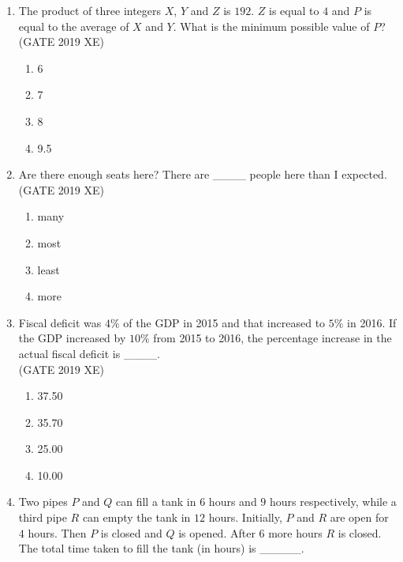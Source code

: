\documentclass[journal,12pt,onecolumn]{IEEEtran}
\begin{document}
\begin{enumerate}
\item The product of three integers $X$, $Y$ and $Z$ is $192$. $Z$ is equal to $4$ and $P$ is equal to the average of $X$ and $Y$. What is the minimum possible value of $P$?\\
\hfill{(GATE 2019 XE)} 
\begin{multicols}{2}
\begin{enumerate}
\item 6
\item 7
\item 8
\item 9.5
\end{enumerate}
\end{multicols}

\item Are there enough seats here? There are \_\_\_\_ people here than I expected.\\
\hfill{(GATE 2019 XE)} \\
\begin{multicols}{2}
\begin{enumerate}
\item many
\item most
\item least
\item more
\end{enumerate}
\end{multicols}

\item Fiscal deficit was $4\%$ of the GDP in 2015 and that increased to $5\%$ in 2016. If the GDP increased by $10\%$ from 2015 to 2016, the percentage increase in the actual fiscal deficit is \_\_\_\_.\\

\hfill{(GATE 2019 XE)} 
\begin{multicols}{2}
\begin{enumerate}
\item 37.50
\item 35.70
\item 25.00
\item 10.00
\end{enumerate}
\end{multicols}

\newpage

\item Two pipes $P$ and $Q$ can fill a tank in $6$ hours and $9$ hours respectively, while a third pipe $R$ can empty the tank in $12$ hours. Initially, $P$ and $R$ are open for $4$ hours. Then $P$ is closed and $Q$ is opened. After $6$ more hours $R$ is closed. The total time taken to fill the tank (in hours) is \_\_\_\_\_.\\


\end{enumerate}
\end{document}
